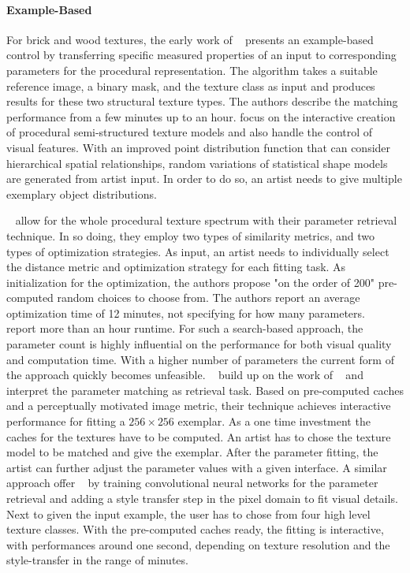\paragraph*{Example-Based}
\label{para:analysis_regular_example}

For brick and wood textures, the early work of \citeauthor*{lefebvre_2000_ass}~\cite{lefebvre_2000_ass} presents an example-based control by transferring specific measured properties of an input to corresponding parameters for the procedural representation. The algorithm takes a suitable reference image, a binary mask, and the texture class as input and produces results for these two structural texture types. The authors describe the matching performance from a few minutes up to an hour. \cite{gilet_2012_map} focus on the interactive creation of procedural semi-structured texture models and also handle the control of visual features. With an improved point distribution function that can consider hierarchical spatial relationships, random variations of statistical shape models are generated from artist input. In order to do so, an artist needs to give multiple exemplary object distributions. 

\citeauthor*{bourque_2004_ptm}~\cite{bourque_2004_ptm} allow for the whole procedural texture spectrum with their parameter retrieval technique. In so doing, they employ two types of similarity metrics, and two types of optimization strategies. As input, an artist needs to individually select the distance metric and optimization strategy for each fitting task. As initialization for the optimization, the authors propose "on the order of 200" pre-computed random choices to choose from. The authors report an average optimization time of 12 minutes, not specifying for how many parameters. \citeauthor*{gilet_2012_mkn}~\cite{gilet_2012_mkn} report more than an hour runtime. For such a search-based approach, the parameter count is highly influential on the performance for both visual quality and computation time. With a higher number of parameters the current form of the approach quickly becomes unfeasible. \citeauthor*{gieseke_2014_ipr}~\cite{gieseke_2014_ipr} build up on the work of \citeauthor*{bourque_2004_ptm}~\cite{bourque_2004_ptm} and interpret the parameter matching as retrieval task. Based on pre-computed caches and a perceptually motivated image metric, their technique achieves interactive performance for fitting a $256\times256$ exemplar. As a one time investment the caches for the textures have to be computed. An artist has to chose the texture model to be matched and give the exemplar. After the parameter fitting, the artist can further adjust the parameter values with a given interface. A similar approach offer \citeauthor*{hu_2019_anf}~\cite{hu_2019_anf} by training convolutional neural networks for the parameter retrieval and adding a style transfer step in the pixel domain to fit visual details. Next to given the input example, the user has to chose from four high level texture classes. With the pre-computed caches ready, the fitting is interactive, with performances around one second, depending on texture resolution and the style-transfer in the range of minutes.

